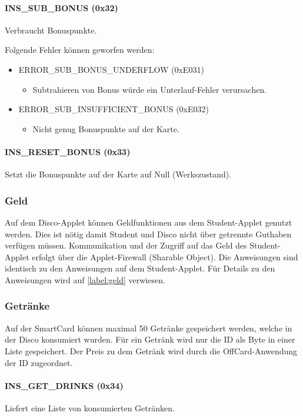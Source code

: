\paragraph{INS\_SUB\_BONUS (0x32)}
Verbraucht Bonuspunkte.

Folgende Fehler können geworfen werden:
\begin{itemize}
	\item ERROR\_SUB\_BONUS\_UNDERFLOW (0xE031)
	\begin{itemize}
		\item Subtrahieren von Bonus würde ein Unterlauf-Fehler verursachen.
	\end{itemize}
	\item ERROR\_SUB\_INSUFFICIENT\_BONUS (0xE032)
	\begin{itemize}
		\item Nicht genug Bonuspunkte auf der Karte.
	\end{itemize}
\end{itemize}
\paragraph{INS\_RESET\_BONUS (0x33)}
Setzt die Bonuspunkte auf der Karte auf Null (Werkszustand).

\subsubsection{Geld}
Auf dem Disco-Applet können Geldfunktionen aus dem Student-Applet genutzt werden.
Dies ist nötig damit Student und Disco nicht über getrennte Guthaben verfügen müssen.
Kommunikation und der Zugriff auf das Geld des Student-Applet erfolgt über die Applet-Firewall (Sharable Object).
Die Anweisungen sind identisch zu den Anweisungen auf dem Student-Applet.
Für Details zu den Anweisungen wird auf \autoref{label:geld} verwiesen.

\subsubsection{Getränke}
Auf der SmartCard können maximal 50 Getränke gespeichert werden, welche in der Disco konsumiert wurden.
Für ein Getränk wird nur die ID als Byte in einer Liste gespeichert.
Der Preis zu dem Getränk wird durch die OffCard-Anwendung der ID zugeordnet.
	
\paragraph{INS\_GET\_DRINKS (0x34)}
Liefert eine Liste von konsumierten Getränken.
